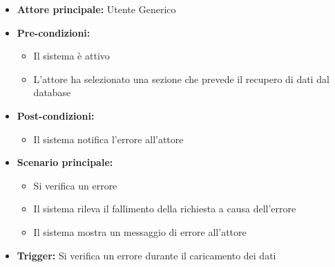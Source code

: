 \documentclass[a4paper,12pt]{article}
\newcommand{\ignoreglossary}{}
\begin{document}
\begin{itemize}
    \item \textbf{Attore principale:} Utente Generico
    \item \textbf{Pre-condizioni:}
    \begin{itemize}
        \item Il sistema è attivo
        \item L'attore ha selezionato una sezione che prevede il recupero di dati dal database
    \end{itemize}
    \item \textbf{Post-condizioni:} 
    \begin{itemize}
        \item Il sistema notifica l'errore all'attore
    \end{itemize}
    \item \textbf{Scenario principale:} 
    \begin{itemize}
        \item Si \ignoreglossary{verifica} un errore
        \item Il sistema rileva il fallimento della richiesta a causa dell'errore
        \item Il sistema mostra un messaggio di errore all'attore
    \end{itemize}
    \item \textbf{Trigger:} Si \ignoreglossary{verifica} un errore durante il caricamento dei dati
\end{itemize}
\end{document}
